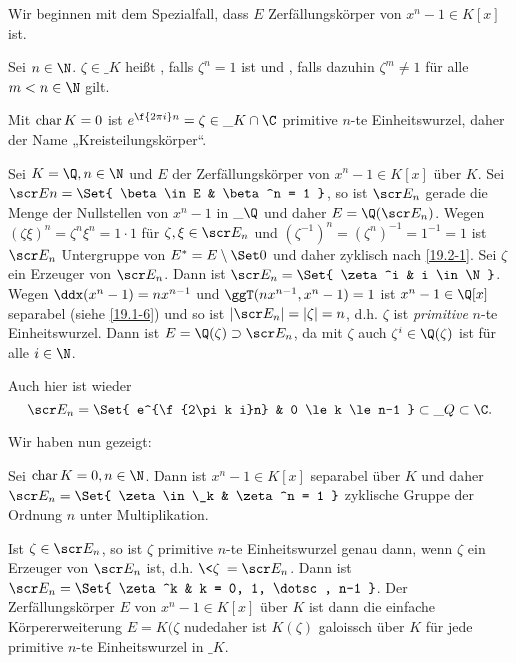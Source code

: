 Wir beginnen mit dem Spezialfall, dass $E$ Zerfällungskörper von $x^n - 1 \in K[x]$ ist.

\begin{df} \label{20.1-1}
	Sei $n \in \N$.
	$\zeta \in \_K$ heißt , falls $\zeta^n = 1$ ist und , falls dazuhin $\zeta^m \neq 1$ für alle $m < n \in \N$ gilt.
	\begin{note}
		Mit $\operatorname{char} K = 0$ ist $e^{\f{2\pi i}n} = \zeta \in \_K \cap \C$ primitive $n$-te Einheitswurzel, daher der Name „Kreisteilungskörper“.
	\end{note}
\end{df}

Sei $K = \Q, n \in \N$ und $E$ der Zerfällungskörper von $x^n - 1 \in K[x]$ über $K$.
Sei $\scr En = \Set{ \beta \in E & \beta^n = 1 }$, so ist $\scr E_n$ gerade die Menge der Nullstellen von $x^n - 1$ in $\_\Q$ und daher $E = \Q(\scr E_n)$.
Wegen $(\zeta \xi)^n = \zeta^n \xi^n = 1 \cdot 1$ für $\zeta, \xi \in \scr E_n$ und $(\zeta^{-1})^n = (\zeta^n)^{-1} = 1^{-1} = 1$ ist $\scr E_n$ Untergruppe von $E^* = E \setminus \Set 0$ und daher zyklisch nach \ref{19.2-1}.
Sei $\zeta$ ein Erzeuger von $\scr E_n$.
Dann ist $\scr E_n = \Set{ \zeta^i & i \in \N }$.
Wegen $\ddx (x^n - 1) = nx^{n-1}$ und $\ggT(nx^{n-1}, x^n - 1) = 1$ ist $x^n - 1 \in \Q[x]$ separabel (siehe \ref{19.1-6}) und so ist $|\scr E_n| = |\zeta| = n$, d.h. $\zeta$ ist \emph{primitive} $n$-te Einheitswurzel.
Dann ist $E = \Q(\zeta) \supset \scr E_n$, da mit $\zeta$ auch $\zeta^i \in \Q(\zeta)$ ist für alle $i \in \N$.
\begin{note}
	Auch hier ist wieder
	\[
		\scr E_n = \Set{ e^{\f{2\pi k i}n} & 0 \le k \le n-1 } \subset \_Q \subset \C.
	\]
\end{note}
Wir haben nun gezeigt:

\begin{st} \label{20.1-2}
	Sei $\Char K = 0, n \in \N$.
	Dann ist $x^n - 1 \in K[x]$ separabel über $K$ und daher $\scr E_n = \Set{ \zeta \in \_k & \zeta^n = 1 }$ zyklische Gruppe der Ordnung $n$ unter Multiplikation.

	Ist $\zeta \in \scr E_n$, so ist $\zeta$ primitive $n$-te Einheitswurzel genau dann, wenn $\zeta$ ein Erzeuger von $\scr E_n$ ist, d.h. $\<\zeta\> = \scr E_n$.
	Dann ist $\scr E_n = \Set{ \zeta^k & k = 0, 1, \dotsc, n-1 }$.
	Der Zerfällungskörper $E$ von $x^n - 1 \in K[x]$ über $K$ ist dann die einfache Körpererweiterung $E = K(\zeta$ nudedaher ist $K(\zeta)$ galoissch über $K$ für jede primitive $n$-te Einheitswurzel in $\_K$.
\end{st}

